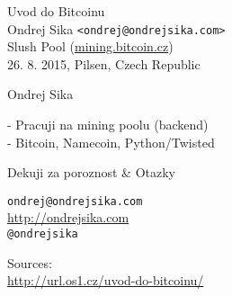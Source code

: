 \documentclass{beamer}
\begin{document}
\begin{frame}

    {\LARGE Uvod do Bitcoinu}\\
    \vspace{7mm}
    {\Large Ondrej Sika \lstinline|<ondrej@ondrejsika.com>|}\\
    \vspace{7mm}
    {\large Slush Pool (\url{mining.bitcoin.cz})}\\
    \vspace{7mm}
    26. 8. 2015, Pilsen, Czech Republic\\

\end{frame}

\begin{frame}

    {\LARGE Ondrej Sika}\\

    \vspace{5mm}

    - Pracuji na mining poolu (backend)\\
    - Bitcoin, Namecoin, Python/Twisted\\

    \vspace{10mm}

\end{frame}

\begin{frame}

    {\LARGE Dekuji za poroznost \& Otazky}\\

    \vspace{1cm}

    \texttt{ondrej@ondrejsika.com}\\
    \url{http://ondrejsika.com}\\
    \texttt{@ondrejsika}\\

    \vspace{1cm}

    Sources:\\
    \url{http://url.os1.cz/uvod-do-bitcoinu/}
\end{frame}
\end{document}
